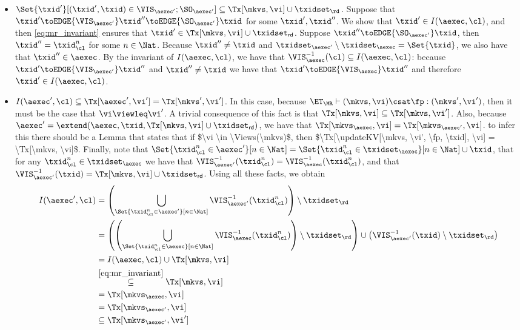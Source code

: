 \begin{itemize}
    \item $\Set{\txid' }[ (\txid', \txid) \in \VIS_{\aexec'} ; \SO_{\aexec'} ] \subseteq \Tx[\mkvs, \vi] \cup \txidset_\rd$. 
Suppose that $\txid' \toEDGE{\VIS_{\aexec'}} \txid'' \toEDGE{\SO_{\aexec'}} \txid$ 
for some $\txid', \txid''$. We show that $\txid' \in I(\aexec, \cl)$, and then \cref{eq:mr_invariant} ensures 
that $\txid' \in \Tx[\mkvs, \vi] \cup \txidset_{\mathsf{rd}}$. 
Suppose $\txid'' \toEDGE{\SO_{\aexec'}} \txid$, then $\txid'' = \txid_{\cl}^{n}$ for some $n \in \Nat$.
Because $\txid'' \neq \txid$ and $\txidset_{\aexec'} \setminus \txidset_{\aexec} = \Set{ \txid }$, we also 
have that $\txid'' \in \aexec$. By the invariant of $I(\aexec, \cl)$, 
we have that $\VIS^{-1}_{\aexec}(\cl) \subseteq I(\aexec, \cl)$:
because $\txid' \toEDGE{\VIS_{\aexec'}} \txid''$ and $\txid'' \neq \txid$ we have 
that $\txid' \toEDGE{\VIS_{\aexec}} \txid''$ and therefore $\txid' \in I(\aexec, \cl)$. 

\item $I(\aexec', \cl) \subseteq \Tx[\aexec', \vi'] = \Tx[\mkvs', \vi']$. 
    In this case, because $\ET_{\MR} \vdash (\mkvs, \vi) \csat \fp: (\mkvs',\vi')$, 
then it must be the case that $\vi \viewleq \vi'$. 
A trivial consequence of this fact is that $\Tx[\mkvs, \vi] \subseteq \Tx[\mkvs, \vi']$.
Also, because $\aexec' = \extend(\aexec, \txid, \Tx[\mkvs, \vi] \cup \txidset_{\mathsf{rd}})$, 
we have that $\Tx[\mkvs_{\aexec}, \vi] = \Tx[\mkvs_{\aexec'}, \vi]$. 
%
%
%
\ac{to infer this there should be a Lemma that states that if $\vi \in \Views(\mkvs)$, 
then $\Tx[\updateKV[\mkvs, \vi', \fp, \txid], \vi] = \Tx[\mkvs, \vi]$.}
%
%
%
Finally, note that $\Set{\txid_{\cl}^{n} \in \aexec' }[ n \in \Nat] = 
\Set{ \txid_{\cl}^{n} \in \txidset_{\aexec} }[ n \in \Nat] \cup \txid$, that for any 
$\txid_{\cl}^{n} \in \txidset_{\aexec}$ we have that $\VIS^{-1}_{\aexec'}(\txid_{\cl}^{n}) = 
\VIS^{-1}_{\aexec}(\txid_{\cl}^{n})$, and that 
$\VIS_{\aexec'}^{-1}(\txid) = \Tx[\mkvs, \vi] \cup \txidset_{\mathsf{rd}}$. 
Using all these facts, we obtain 
\begin{align*}
    I(\aexec', \cl) 
    &= \left( \bigcup_{\Set{\txid_{\cl}^{n} \in \aexec' }[ n \in \Nat]} \VIS_{\aexec'}^{-1}(\txid_{\cl}^{n}) \right) \setminus \txidset_\rd \\
    &= \left( \left( \bigcup_{\Set{\txid_{\cl}^{n} \in \aexec }[ n \in \Nat]} \VIS_{\aexec}^{-1}(\txid_{\cl}^{n}) \right) \setminus \txidset_\rd  \right) \cup \left( \VIS^{-1}_{\aexec'}(\txid) \setminus \txidset_\rd  \right) \\
    &= I(\aexec, \cl) \cup \Tx[\mkvs, \vi] \\
    &\stackrel{\eqref{eq:mr_invariant}}{\subseteq} \Tx[\mkvs, \vi] \\
    &= \Tx[\mkvs_\aexec, \vi] \\
    &= \Tx[\mkvs_{\aexec'}, \vi] \\
    &\subseteq \Tx[\mkvs_{\aexec'}, \vi']
\end{align*}
\end{itemize}

